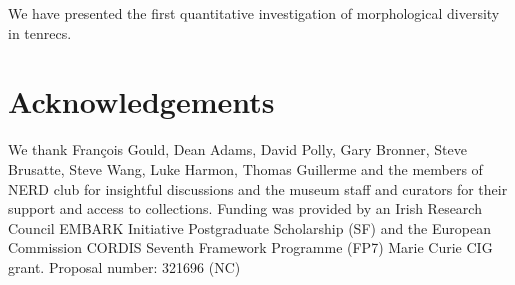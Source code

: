 \documentclass[12pt,a4paper]{article}
\begin{document}
	We have presented the first quantitative investigation of morphological diversity in tenrecs. 
	


 
	
\section{Acknowledgements}

	We thank Fran\c{c}ois Gould, Dean Adams, David Polly, Gary Bronner, Steve Brusatte, Steve Wang, Luke Harmon, Thomas Guillerme and the members of NERD club for insightful discussions and the museum staff and curators for their support and access to collections. Funding was provided by an Irish Research Council EMBARK Initiative Postgraduate Scholarship (SF) and the European Commission CORDIS Seventh Framework Programme (FP7) Marie Curie CIG grant. Proposal number: 321696 (NC)





\end{document}

